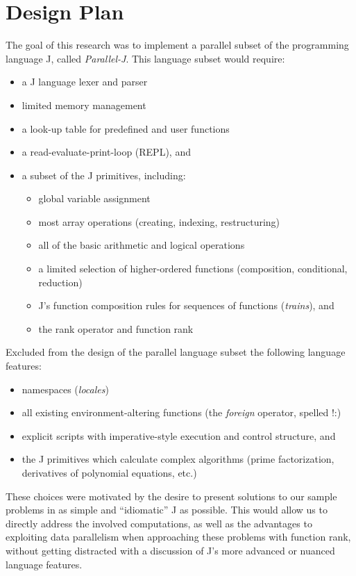 \section{Design Plan}
\label{desp}
The goal of this research was
to implement a parallel subset of the programming language J, called \textit{Parallel-J}.
This language subset would require:\cite{ioj} 
\begin{itemize}
	\item a J language lexer and parser
	\item limited memory management
	\item a look-up table for predefined and user functions
	\item a read-evaluate-print-loop (REPL), and
	\item a subset of the J primitives, including: 
	\begin{itemize}
		\item global variable assignment
		\item most array operations (creating, indexing, restructuring)
		\item all of the basic arithmetic and logical operations
		\item a limited selection of higher-ordered functions (composition, conditional, reduction)
		\item J's function composition rules for sequences of functions (\textit{trains}), and
		\item the rank operator and function rank
	\end{itemize}
\end{itemize}

Excluded from the design of the parallel language subset the following language features: 
\begin{itemize}
	\item namespaces (\textit{locales})
	\item all existing environment-altering functions (the \textit{foreign} operator, spelled \ttfamily!:\normalfont)
	\item explicit scripts with imperative-style execution and control structure, and
	\item the J primitives which calculate complex algorithms (prime factorization, derivatives of polynomial equations, etc.)
\end{itemize}

These choices were motivated by the desire to present solutions to our sample problems in as simple and ``idiomatic'' J as possible.
This would allow us to directly address the involved computations, 
as well as the advantages to exploiting data parallelism when approaching these problems with function rank, 
without getting distracted with a discussion of J's more advanced or nuanced language features.

